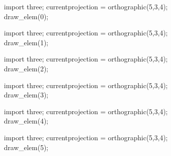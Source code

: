 \documentclass[../key.tex]{subfiles}
\begin{document}
\begin{figure}[h]
	\begin{center}
		\begin{minipage}[b]{0.3\textwidth}
			\centering
			\begin{asy}[width=0.8\textwidth]
				import three;
				currentprojection = orthographic(5,3,4);
				draw_elem(0);
			\end{asy}
		\end{minipage}
		\hfill
		\begin{minipage}[b]{0.3\textwidth}
			\centering
			\begin{asy}[width=0.8\textwidth]
				import three;
				currentprojection = orthographic(5,3,4);
				draw_elem(1);
			\end{asy}
		\end{minipage}
		\hfill
		\begin{minipage}[b]{0.3\textwidth}
			\centering
			\begin{asy}[width=0.8\textwidth]
				import three;
				currentprojection = orthographic(5,3,4);
				draw_elem(2);
			\end{asy}
		\end{minipage}
	\end{center}

	\begin{center}
		\begin{minipage}[b]{0.3\textwidth}
			\centering
			\begin{asy}[width=0.8\textwidth]
				import three;
				currentprojection = orthographic(5,3,4);
				draw_elem(3);
			\end{asy}
		\end{minipage}
		\hfill
		\begin{minipage}[b]{0.3\textwidth}
			\centering
			\begin{asy}[width=0.8\textwidth]
				import three;
				currentprojection = orthographic(5,3,4);
				draw_elem(4);
			\end{asy}
		\end{minipage}
		\hfill
		\begin{minipage}[b]{0.3\textwidth}
			\centering
			\begin{asy}[width=0.9\textwidth]
				import three;
				currentprojection = orthographic(5,3,4);
				draw_elem(5);
			\end{asy}
		\end{minipage}
	\end{center}
\end{figure}
\end{document}
